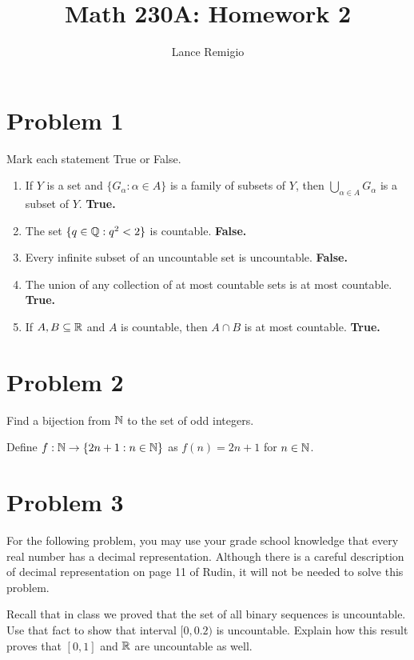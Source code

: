 \documentclass[11pt,a4paper]{article}
\title{Math 230A: Homework 2}
\author{Lance Remigio}
\begin{document}
\maketitle

\section*{Problem 1} Mark each statement True or False.

\begin{enumerate}
    \item If \( Y  \) is a set and \( \{ {G}_{\alpha} : \alpha \in A  \}   \) is a family of subsets of \( Y  \), then \( \bigcup_{ \alpha \in A  }^{  }  {G}_{\alpha} \) is a subset of \( Y  \). \textbf{True.}
    \item The set \( \{ q \in \mathbb{Q} : q^{2} < 2  \}  \) is countable. \textbf{False.}     
    \item Every infinite subset of an uncountable set is uncountable. \textbf{False.} 
    \item The union of any collection of at most countable sets is at most countable. \textbf{True.}
    \item If \( A,B \subseteq \mathbb{R}  \) and \( A  \) is countable, then \( A \cap B  \) is at most countable. \textbf{True.}
\end{enumerate}

\section*{Problem 2} Find a bijection from \( \mathbb{N}  \) to the set of odd integers.
\begin{solution}
Define \( f: \mathbb{N} \to \{ 2n + 1: n \in \mathbb{N} \}  \) as \( f(n) = 2n + 1  \) for \( n \in \mathbb{N} \). 
\end{solution}

\section*{Problem 3} For the following problem, you may use your grade school knowledge that every real number has a decimal representation. Although there is a careful description of decimal representation on page 11 of Rudin, it will not be needed to solve this problem. 

Recall that in class we proved that the set of all binary sequences is uncountable. Use that fact to show that interval \( [0,0.2) \) is uncountable. Explain how this result proves that \( [0,1] \) and \( \mathbb{R}  \) are uncountable as well.
\end{document}
